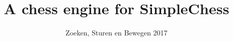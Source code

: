 \documentclass{article}
\title{A chess engine for SimpleChess}
\author{Zoeken, Sturen en Bewegen 2017}
\date{}
\begin{document}
\maketitle


\begin{comment}
\section*{Introduction}
In this assignment, you will program a chess engine for a simplified version of chess. You will be using the minimax algorithm to implement the chess engine. Minimax allows the computer to evaluate all possible moves up to a certain depth and then choose the one that maximizes the win, given that an ideal opponent plays against you.

The framework of with the assignment contains the basic functionality to play chess. It is now your task to implement the minimax function (plus alpha-beta optimization) and all helper functions necessary to make the chess engine work correctly. 


\section*{SimpleChess}
Chess itself contains many different and special rules, which can take some time to implement. In order to make this assignment more containable and less tedious to implement, we will be looking at a simplified kind of chess game called SimpleChess. In SimpleChess, the only chess pieces used are the king, rook and pawn. While the king can still reach any adjacent square (horizontal, vertical and diagonal) and the rook can still reach all horizontal and vertical squares, the pawn always only moves one place forward.

You may use the following simplifications:
\begin{itemize}
    \item The only pieces on the board are the king, pawn and rook.
    \item A pawn cannot promote when it reaches the other side.
    \item A pawn can only move one piece forward at a time (even the first turn).
    \item There is no checkmate; the game is over when one of the kings is hit.
    \item You do not need to worry about stalemate until later in the assignment
\end{itemize}


\end{comment}
\end{document}
